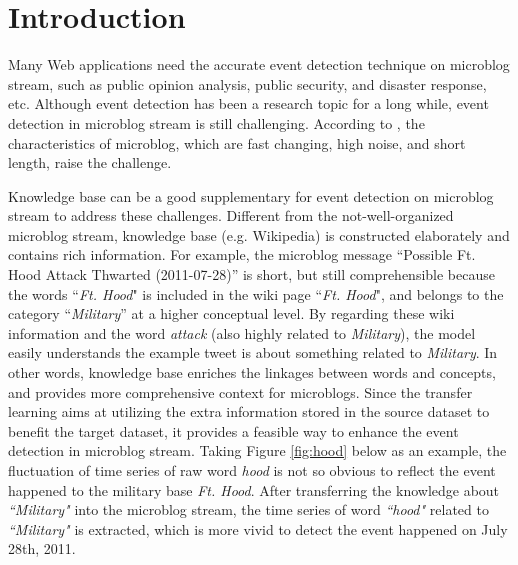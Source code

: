 \documentclass[runningheads,a4paper]{llncs}
\theoremstyle{exampstyle}
\begin{document}
\section{Introduction}
Many Web applications need the accurate event detection technique on microblog stream, such as public opinion analysis\cite{thelwall2011sentiment}, public security\cite{Li:2012gw}, and disaster response\cite{Yin:2012ht}, etc.
Although event detection has been a research topic for a long while\cite{allan1998topic}, event detection in microblog stream is still challenging\cite{atefeh2015survey}.
According to \cite{huang2016probabilistic}, the characteristics of microblog, which are fast changing, high noise, and short length, raise the challenge.

Knowledge base can be a good supplementary for event detection on microblog stream to address these challenges.
Different from the not-well-organized microblog stream, knowledge base (e.g. Wikipedia) is constructed elaborately and contains rich information. 
For example, the microblog message ``Possible Ft. Hood Attack Thwarted (2011-07-28)'' is short, but still comprehensible because the words ``\textit{Ft. Hood}" is included in the wiki page ``\textit{Ft. Hood}", and belongs to the category ``\textit{Military}'' at a higher conceptual level.
By regarding these wiki information and the word \textit{attack} (also highly related to \textit{Military}), the model easily understands the example tweet is about something related to \textit{Military}.
In other words, knowledge base enriches the linkages between words and concepts, and provides more comprehensive context for microblogs.
Since the transfer learning\cite{pan2010survey} aims at utilizing the extra information stored in the source dataset to benefit the target dataset, it provides a feasible way to enhance the event detection in microblog stream.
Taking Figure \ref{fig:hood} below as an example, the fluctuation of time series of raw word \textit{hood} is not so obvious to reflect the event happened to the military base \textit{Ft. Hood}.
After transferring the knowledge about \textit{``Military"} into the microblog stream, the time series of word \textit{``hood"} related to \textit{``Military"} is extracted, which is more vivid to detect the event happened on July 28th, 2011.
\end{document}
